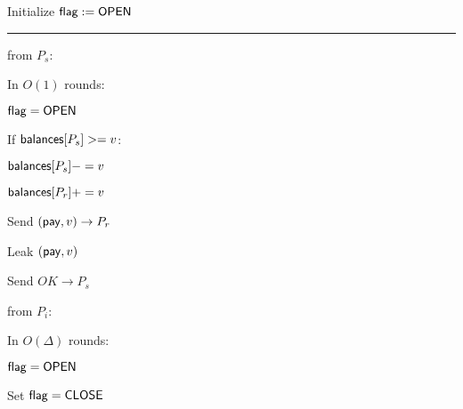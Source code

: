 \begin{bbox}[title={$\F_{\msf{pay}} (P_s, P_r, \msf{balances}, \Delta)$}]

Initialize ${\mathsf {flag}} := {\mathsf {OPEN}}$

\vspace{2mm} \hrule \vspace{2mm}

\OnInput {} from $P_s$:
	\begin{renumerate}
			\item In $O(1)$ rounds:  
				
				\quad \Require ${\mathsf {flag}} = {\mathsf {OPEN}}$
				
				\quad If ${\mathsf {balances}}[P_s] >= v$:
			
				\qquad ${\mathsf {balances}}[P_s] -= v$
				
				\qquad ${\mathsf {balances}}[P_r] += v$
				
				\qquad Send $({\mathsf {pay}}, v) \rightarrow P_r$

		\item Leak $({\mathsf {pay}}, v)$

		\item Send $OK \rightarrow P_s$

	\end{renumerate}

\OnInput {} from $P_i$:
	\begin{renumerate}	
			\item In $O(\Delta)$ rounds:  

			\qquad \Require ${\mathsf {flag}} = {\mathsf {OPEN}}$

			\qquad Set ${\mathsf {flag}} = {\mathsf {CLOSE}}$








\end{renumerate}
\end{bbox}
